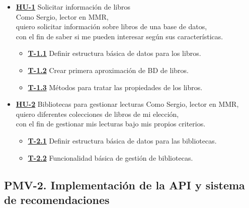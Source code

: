 \begin{itemize}
    \item \href{https://github.com/Anglepi/My-Many-Reads/issues/29}{\textbf{HU-1}} Solicitar información de libros \\
    Como Sergio, lector en MMR, \\
    quiero solicitar información sobre libros de una base de datos, \\
    con el fin de saber si me pueden interesar según sus características.
    \begin{itemize}
        \item \href{https://github.com/Anglepi/My-Many-Reads/issues/31}{\textbf{T-1.1}} Definir estructura básica de datos para los libros.
        \item \href{https://github.com/Anglepi/My-Many-Reads/issues/32}{\textbf{T-1.2}} Crear primera aproximación de BD de libros.
        \item \href{https://github.com/Anglepi/My-Many-Reads/issues/33}{\textbf{T-1.3}} Métodos para tratar las propiedades de los libros.
    \end{itemize}
    \item \href{https://github.com/Anglepi/My-Many-Reads/issues/30}{\textbf{HU-2}} Bibliotecas para gestionar lecturas
    Como Sergio, lector en MMR, \\
    quiero diferentes colecciones de libros de mi elección, \\
    con el fin de gestionar mis lecturas bajo mis propios criterios.
    \begin{itemize}
        \item \href{https://github.com/Anglepi/My-Many-Reads/issues/34}{\textbf{T-2.1}} Definir estructura básica de datos para las bibliotecas.
        \item \href{https://github.com/Anglepi/My-Many-Reads/issues/35}{\textbf{T-2.2}} Funcionalidad básica de gestión de bibliotecas.
    \end{itemize}
\end{itemize}

\subsection{PMV-2. Implementación de la API y sistema de recomendaciones}

